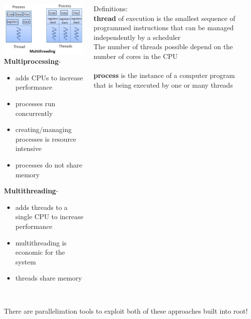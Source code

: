 \documentclass[10pt]{beamer}
\begin{document}
\begin{frame}
\begin{columns}
	\begin{column}{0.5\textwidth}
\scriptsize
   		\includegraphics[scale=0.45, left]{Multithreading.jpg}\\
   		\textbf{Multiprocessing}-\\
   		\begin{itemize}
   			\item adds CPUs to increase performance
   			\item processes run concurrently
   			\item creating/managing processes is resource intensive
   			\item processes do not share memory
   		\end{itemize}
   		\textbf{Multithreading}-\\
   		\begin{itemize} 
   			\item adds threads to a single CPU to increase performance
   			\item multithreading is economic for the system
   			\item threads share memory
   		\end{itemize}

\end{column}
	\begin{column}{0.5\textwidth}
	Definitions:\\
	\scriptsize
	\textbf{thread} of execution is the smallest sequence of programmed instructions that can be managed independently by a scheduler\\
	The number of threads possible depend on the number of cores in the CPU\\
	\quad \quad \\
	
	\textbf{process} is the instance of a computer program that is being executed by one or many threads\\
\end{column}
\end{columns}
\scriptsize
\quad \quad \\
There are parallelization tools to exploit both of these approaches built into root!
\end{frame}
\end{document}
